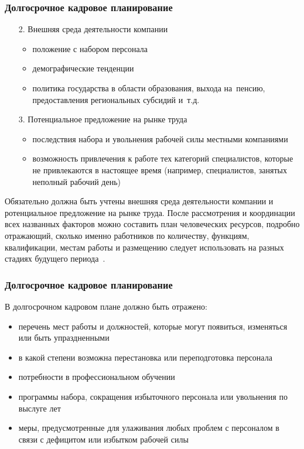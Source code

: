 \documentclass{../industrial-development}
\begin{document}

\begin{frame} \frametitle{Долгосрочное кадровое планирование}
   \begin{itemize}
\item[2.] Внешняя среда деятельности компании
  \begin{itemize}
		\item	положение с набором персонала
		\item	демографические тенденции
		\item политика государства в области образования, выхода на~пенсию, предоставления региональных субсидий и~т.д.
  \end{itemize}

	\item[3.] Потенциальное предложение на рынке труда
		  \begin{itemize}
		\item последствия набора и увольнения рабочей силы местными компаниями
    \item	возможность привлечения к работе тех категорий специалистов, которые не привлекаются в настоящее время (например, специалистов, занятых неполный рабочий день)

		  \end{itemize}
  \end{itemize}
\end{frame}

\lecturenotes

Обязательно должна быть учтены внешняя среда деятельности компании и ротенциальное предложение на рынке труда. После рассмотрения и координации всех названных факторов можно составить план человеческих ресурсов, подробно отражающий, сколько именно работников по количеству, функциям, квалификации, местам работы и размещению следует использовать на разных стадиях будущего периода~\cite[с.~86]{Ivanova}.



\begin{frame} \frametitle{Долгосрочное кадровое планирование}

 В долгосрочном кадровом плане должно быть отражено:
  \begin{itemize}
  \item	перечень мест работы и должностей, которые могут появиться, изменяться или быть упраздненными
  \item	в какой степени возможна перестановка или переподготовка персонала
  \item	потребности в профессиональном обучении
  \item	программы набора, сокращения избыточного персонала или увольнения по выслуге лет
   \item	меры, предусмотренные для улаживания любых проблем с персоналом в связи с дефицитом или избытком рабочей силы 

	  \end{itemize}

\end{frame}
\end{document}
